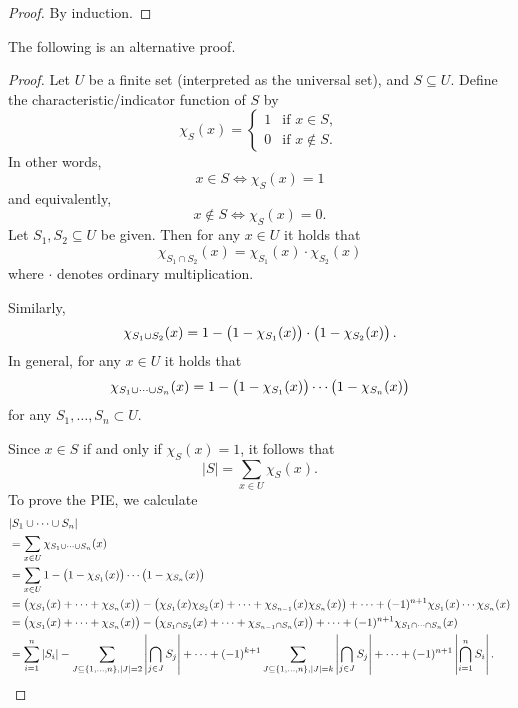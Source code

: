 \begin{proof}
By induction.
\end{proof}

The following is an alternative proof.

\begin{proof}
Let $U$ be a finite set (interpreted as the universal set), and $S\subseteq U$. Define the characteristic/indicator function of $S$ by
\[ \chi_S(x)=\begin{cases}
1&\text{if }x\in S,\\
0&\text{if }x\notin S.
\end{cases} \]
In other words,
\[ x\in S\iff\chi_S(x)=1 \]
and equivalently,
\[ x\notin S\iff\chi_S(x)=0. \]
Let $S_1,S_2\subseteq U$ be given. Then for any $x\in U$ it holds that
\[ \chi_{S_1\cap S_2}(x)=\chi_{S_1}(x)\cdot\chi_{S_2}(x) \]
where $\cdot$ denotes ordinary multiplication.

Similarly,
\[ \chi_{S_1\cup S_2}(x)=1-\left(1-\chi_{S_1}(x)\right)\cdot\left(1-\chi_{S_2}(x)\right). \]
In general, for any $x\in U$ it holds that
\[ \chi_{S_1\cup\cdots\cup S_n}(x)=1-\left(1-\chi_{S_1}(x)\right)\cdots\left(1-\chi_{S_n}(x)\right) \]
for any $S_1,\dots,S_n\subset U$.

Since $x\in S$ if and only if $\chi_S(x)=1$, it follows that
\[ |S|=\sum_{x\in U}\chi_S(x). \]
To prove the PIE, we calculate
\begin{align*}
&|S_1\cup\cdots\cup S_n|\\
&=\sum_{x\in U}\chi_{S_1\cup\cdots\cup S_n}(x)\\
&=\sum_{x\in U}1-\left(1-\chi_{S_1}(x)\right)\cdots\left(1-\chi_{S_n}(x)\right)\\
&=\left(\chi_{S_1}(x)+\cdots+\chi_{S_n}(x)\right)-\left(\chi_{S_1}(x)\chi_{S_2}(x)+\cdots+\chi_{S_{n-1}}(x)\chi_{S_n}(x)\right)+\cdots+(-1)^{n+1}\chi_{S_1}(x)\cdots\chi_{S_n}(x)\\
&=\left(\chi_{S_1}(x)+\cdots+\chi_{S_n}(x)\right)-\left(\chi_{S_1\cap S_2}(x)+\cdots+\chi_{S_{n-1}\cap S_n}(x)\right)+\cdots+(-1)^{n+1}\chi_{S_1\cap\cdots\cap S_n}(x)\\
&=\sum_{i=1}^n|S_i|-\sum_{J\subseteq\{1,\dots,n\},|J|=2}\left|\bigcap_{j\in J}S_j\right|+\cdots+(-1)^{k+1}\sum_{J\subseteq\{1,\dots,n\},|J|=k}\left|\bigcap_{j\in J}S_j\right|+\cdots+(-1)^{n+1}\left|\bigcap_{i=1}^nS_i\right|.
\end{align*}
\end{proof}


